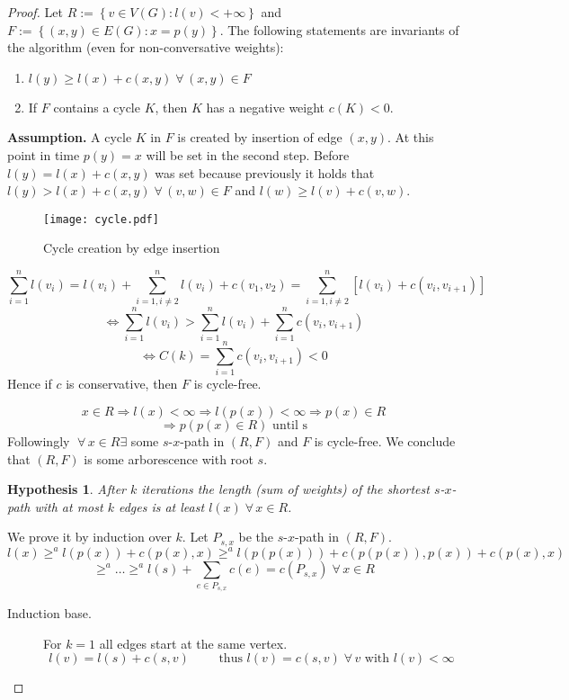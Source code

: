 \documentclass{article}
\newtheorem*{hypothesis}{Hypothesis}
\newcommand{\set}[1]{\left\{#1\right\}}
\newcommand{\gath}[2]{$#1$-$#2$-path} %
\newcommand{\fall}{\;\forall\,}
\begin{document}
\begin{proof}
  Let $R := \set{v \in V(G): l(v) < +\infty}$ and $F := \set{(x, y) \in E(G): x = p(y)}$.
  The following statements are invariants of the algorithm (even for non-conversative weights):
  \begin{enumerate}
    \item $l(y) \geq l(x) + c(x, y) \fall (x, y) \in F$
    \item If $F$ contains a cycle $K$, then $K$ has a negative weight $c(K) < 0$.
  \end{enumerate}

  \textbf{Assumption.}
    A cycle $K$ in $F$ is created by insertion of edge $(x, y)$. At this point in time $p(y) = x$ will be set in the second step. Before $l(y) = l(x) + c(x, y)$ was set because previously it holds that $l(y) > l(x) + c(x, y) \fall (v, w) \in F$ and $l(w) \geq l(v) + c(v, w)$.
  \begin{figure}[!h]
    \begin{center}
      \texttt{[image: cycle.pdf]}
      \caption{Cycle creation by edge insertion}
    \end{center}
  \end{figure}
  \[
    \sum_{i=1}^{n} l(v_i) = l(v_i) + \sum_{i=1, i\neq2}^n l(v_i) + c(v_1, v_2) = \sum_{i=1,i\neq2}^n [l(v_i) + c(v_i, v_{i+1})]
  \] \[
    \Leftrightarrow \sum_{i=1}^n l(v_i) > \sum_{i=1}^n l(v_i) + \sum_{i=1}^n c(v_i, v_{i+1})
  \] \[
    \Leftrightarrow C(k) = \sum_{i=1}^n c(v_i, v_{i+1}) < 0
  \]
  Hence if $c$ is conservative, then $F$ is cycle-free.

  \[
    x \in R \Rightarrow l(x) < \infty \Rightarrow l(p(x)) < \infty \Rightarrow p(x) \in R
  \] \[
    \Rightarrow p(p(x) \in R) \text{ until s}
  \]
  Followingly $\fall x \in R \exists$ some \gath sx in $(R, F)$ and $F$ is cycle-free. We conclude that $(R, F)$ is some arborescence  with root $s$.

  \begin{hypothesis} %
    After $k$ iterations the length (sum of weights) of the shortest \gath sx with at most $k$ edges is at least $l(x) \fall x \in R$.
  \end{hypothesis}

  We prove it by induction over $k$. Let $P_{s,x}$ be the \gath sx in $(R, F)$.
  \[
    l(x) \geq^a l(p(x)) + c(p(x), x) \geq^a l(p(p(x))) + c(p(p(x)), p(x)) + c(p(x), x)
  \] \[
    \geq^a \ldots \geq^a l(s) + \sum_{e \in P_{s,x}} c(e) = c(P_{s,x}) \fall x \in R
  \]

  \begin{description}
    \item[Induction base.]
      For $k=1$ all edges start at the same vertex. \\
      \[
        l(v) = l(s) + c(s, v) \qquad \text{ thus } l(v) = c(s, v) \fall v \text{ with } l(v) < \infty
      \]


\end{description}
\end{proof}
\end{document}
